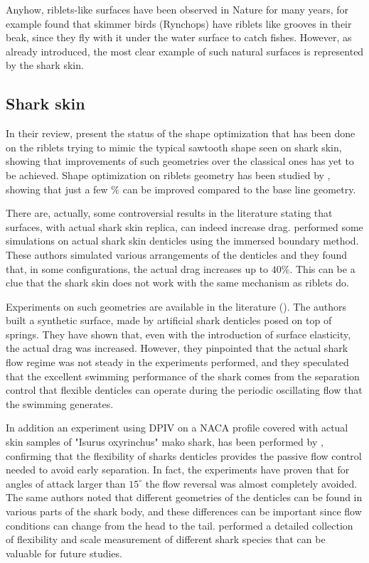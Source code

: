 Anyhow, riblets-like surfaces have been observed in Nature for many years, for example \citet{Martin2016riblets} found that skimmer birds (Rynchops) have riblets like grooves in their beak, since they fly with it under the water surface to catch fishes.
However, as already introduced, the most clear example of such natural surfaces is represented by the shark skin.

\subsection{Shark skin}
In their review, \citet{dean2010shark} present the status of the shape optimization that has been done on the riblets trying to mimic the typical sawtooth shape seen on shark skin, showing that improvements of such geometries over the classical ones has yet to be achieved.
Shape optimization on riblets geometry has been studied by \citet{bechert1997experiments}, showing that just a few $\%$ can be improved compared to the base line geometry.

There are, actually, some controversial results in the literature stating that surfaces, with actual shark skin replica, can indeed increase drag.
\citet{boomsma2016direct} performed some simulations on actual shark skin denticles using the immersed boundary method. These authors simulated various arrangements of the denticles and they found that, in some configurations, the actual drag increases up to $40\%$. This can be a clue that the shark skin does not work with the same mechanism as riblets do.

Experiments on such geometries are available in the literature (\citet{bechert1997natural}).
The authors built a synthetic surface, made by artificial shark denticles posed on top of springs. They have shown that, even with the introduction of surface elasticity, the actual drag was increased.
However, they pinpointed that the actual shark flow regime was not steady in the experiments performed, and they speculated that the excellent swimming performance of the shark comes from the separation control that flexible denticles can operate during the periodic oscillating flow that the swimming generates.

In addition an experiment using DPIV on a NACA profile covered with actual skin samples of "Isurus oxyrinchus" mako shark, has been performed by \citet{lang2014SharkControl}, confirming that the flexibility of sharks denticles provides the passive flow control needed to avoid early separation.
In fact, the experiments have proven that for angles of attack larger than $15^{\circ}$ the flow reversal was almost completely avoided.
The same authors noted that different geometries of the denticles can be found in various parts of the shark body, and these differences can be important since flow conditions can change from the head to the tail.
\citet{motta2012Shark} performed a detailed collection of flexibility and scale measurement of different shark species that can be valuable for future studies.

